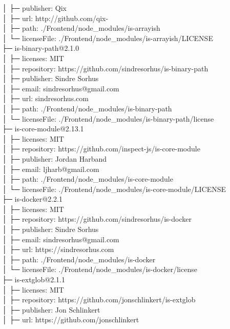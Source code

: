 │  ├─ publisher: Qix\\
│  ├─ url: http://github.com/qix-\\
│  ├─ path: ./Frontend/node\_modules/is-arrayish\\
│  └─ licenseFile: ./Frontend/node\_modules/is-arrayish/LICENSE\\
├─ is-binary-path@2.1.0\\
│  ├─ licenses: MIT\\
│  ├─ repository: https://github.com/sindresorhus/is-binary-path\\
│  ├─ publisher: Sindre Sorhus\\
│  ├─ email: sindresorhus@gmail.com\\
│  ├─ url: sindresorhus.com\\
│  ├─ path: ./Frontend/node\_modules/is-binary-path\\
│  └─ licenseFile: ./Frontend/node\_modules/is-binary-path/license\\
├─ is-core-module@2.13.1\\
│  ├─ licenses: MIT\\
│  ├─ repository: https://github.com/inspect-js/is-core-module\\
│  ├─ publisher: Jordan Harband\\
│  ├─ email: ljharb@gmail.com\\
│  ├─ path: ./Frontend/node\_modules/is-core-module\\
│  └─ licenseFile: ./Frontend/node\_modules/is-core-module/LICENSE\\
├─ is-docker@2.2.1\\
│  ├─ licenses: MIT\\
│  ├─ repository: https://github.com/sindresorhus/is-docker\\
│  ├─ publisher: Sindre Sorhus\\
│  ├─ email: sindresorhus@gmail.com\\
│  ├─ url: https://sindresorhus.com\\
│  ├─ path: ./Frontend/node\_modules/is-docker\\
│  └─ licenseFile: ./Frontend/node\_modules/is-docker/license\\
├─ is-extglob@2.1.1\\
│  ├─ licenses: MIT\\
│  ├─ repository: https://github.com/jonschlinkert/is-extglob\\
│  ├─ publisher: Jon Schlinkert\\
│  ├─ url: https://github.com/jonschlinkert\\
